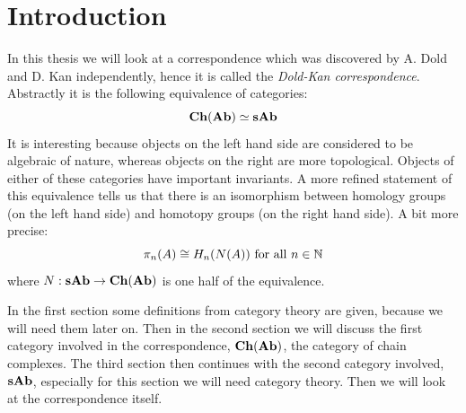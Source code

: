 \documentclass[titlepage, 11pt]{amsproc}
\theoremstyle{plain}
\theoremstyle{definition}
\begin{document}
\section*{Introduction}
In this thesis we will look at a correspondence which was discovered by A. Dold \cite{dold} and D. Kan \cite{kan} independently, hence it is called the \emph{Dold-Kan correspondence}. Abstractly it is the following equivalence of categories:
$$ \mathbf{Ch}(\mathbf{Ab}) \simeq \mathbf{sAb} $$
It is interesting because objects on the left hand side are considered to be algebraic of nature, whereas objects on the right are more topological. Objects of either of these categories have important invariants. A more refined statement of this equivalence tells us that there is an isomorphism between homology groups (on the left hand side) and homotopy groups (on the right hand side). A bit more precise:
$$ \pi_n(A) \cong H_n(N(A)) \text{ for all } n \in \mathbb{N} $$
where $N: \mathbf{sAb} \to \mathbf{Ch}(\mathbf{Ab})$ is one half of the equivalence.

In the first section some definitions from category theory are given, because we will need them later on. Then in the second section we will discuss the first category involved in the correspondence, $\mathbf{Ch}(\mathbf{Ab})$, the category of chain complexes. The third section then continues with the second category involved, $\mathbf{sAb}$, especially for this section we will need category theory. Then we will look at the correspondence itself.

\newpage


\newpage


\newpage


\newpage


\newpage


\newpage
\listoftodos

\nocite{*}

	
\end{document}
